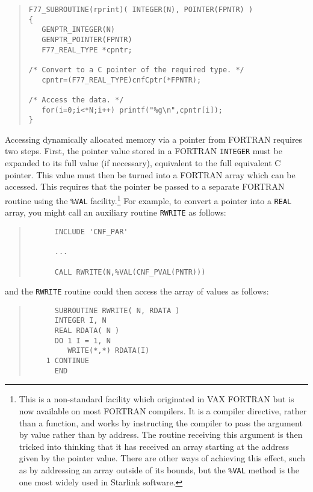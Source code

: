 \documentclass[twoside,11pt]{article}
\renewcommand{\_}{\texttt{\symbol{95}}}
\begin{document}
{\small \begin{quote} \begin{verbatim}
F77_SUBROUTINE(rprint)( INTEGER(N), POINTER(FPNTR) )
{
   GENPTR_INTEGER(N)
   GENPTR_POINTER(FPNTR)
   F77_REAL_TYPE *cpntr;

/* Convert to a C pointer of the required type. */
   cpntr=(F77_REAL_TYPE)cnfCptr(*FPNTR);

/* Access the data. */
   for(i=0;i<*N;i++) printf("%g\n",cpntr[i]);
}
\end{verbatim} \end{quote} }

Accessing dynamically allocated memory via a pointer from FORTRAN
requires two steps. First, the pointer value stored in a
FORTRAN \texttt{INTEGER} must be expanded to its full value (if
necessary), equivalent to the full equivalent C pointer. This value
must then be turned into a FORTRAN array which can be accessed. This
requires that the pointer be passed to a separate FORTRAN routine
using the \texttt{\%VAL} facility.\footnote{This is a non-standard
facility which originated in VAX FORTRAN but is now available on most
FORTRAN compilers. It is a compiler directive, rather than a function,
and works by instructing the compiler to pass the argument by value
rather than by address. The routine receiving this argument is then
tricked into thinking that it has received an array starting at the
address given by the pointer value. There are other ways of achieving
this effect, such as by addressing an array outside of its bounds, but
the \texttt{\%VAL} method is the one most widely used in Starlink
software.}  For example, to convert a pointer into a \texttt{REAL}
array, you might call an auxiliary routine \texttt{RWRITE} as
follows:
{\small \begin{quote} \begin{verbatim}
      INCLUDE 'CNF_PAR'

      ...

      CALL RWRITE(N,%VAL(CNF_PVAL(PNTR)))
\end{verbatim} \end{quote} }
and the \texttt{RWRITE} routine could then access the array of values as
follows:
{\small \begin{quote} \begin{verbatim}
      SUBROUTINE RWRITE( N, RDATA )
      INTEGER I, N
      REAL RDATA( N )
      DO 1 I = 1, N
         WRITE(*,*) RDATA(I)
    1 CONTINUE
      END
\end{verbatim} \end{quote} }
\end{document}
